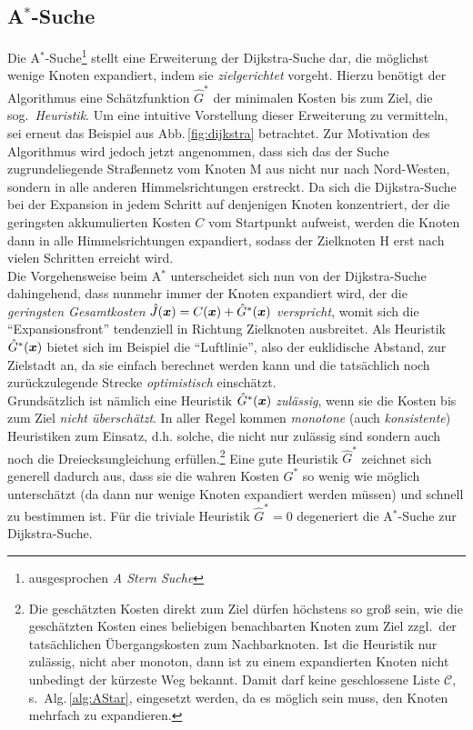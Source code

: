 \subsection{A$^\ast$-Suche} \label{sec:astern}
Die A$^\ast$-Suche\footnote{ausgesprochen \emph{A Stern Suche}} stellt eine Erweiterung der Dijkstra-Suche dar, die möglichst wenige Knoten expandiert, indem sie \emph{zielgerichtet} vorgeht. 
Hierzu benötigt der Algorithmus eine Schätzfunktion $\hat {G}^\ast$ der minimalen Kosten bis zum Ziel, die sog.\ \emph{Heuristik}. Um eine intuitive Vorstellung dieser Erweiterung zu vermitteln, sei erneut das Beispiel aus Abb.\,\ref{fig:dijkstra} betrachtet. Zur Motivation des Algorithmus wird jedoch jetzt angenommen, dass sich das der Suche zugrundeliegende Straßennetz vom Knoten M aus nicht nur nach Nord-Westen, sondern in alle anderen Himmelsrichtungen erstreckt. Da sich die Dijkstra-Suche bei der Expansion in jedem Schritt auf denjenigen Knoten konzentriert, der die geringsten akkumulierten Kosten $C$ vom Startpunkt aufweist, werden die Knoten dann in alle Himmelsrichtungen expandiert, sodass der Zielknoten H erst nach vielen Schritten erreicht wird. \\
Die Vorgehensweise beim A$^\ast$ unterscheidet sich nun von der Dijkstra-Suche dahingehend, dass nunmehr immer der Knoten expandiert wird, der die \emph{geringsten Gesamtkosten} $\hat J(\boldsymbol{x})  = C(\boldsymbol{x}) + \hat {G}^\ast(\boldsymbol{x})$ \emph{verspricht}, womit sich die "`Expansionsfront"' tendenziell in Richtung Zielknoten ausbreitet. Als Heuristik $\hat {G}^\ast(\boldsymbol{x})$ bietet sich im Beispiel die "`Luftlinie"', also der euklidische Abstand, zur Zielstadt an, da sie einfach berechnet werden kann und die tatsächlich noch zurückzulegende Strecke \emph{optimistisch}
einschätzt. \\ 
Grundsätzlich ist nämlich eine Heuristik $\hat {G}^\ast(\boldsymbol{x})$ \emph{zulässig}, wenn sie die Kosten bis zum Ziel \emph{nicht überschätzt}. In aller Regel kommen \emph{monotone} (auch \emph{konsistente})  Heuristiken zum Einsatz, d.h. solche, die nicht nur zulässig sind sondern auch noch die Dreiecksungleichung erfüllen.\footnote{Die geschätzten Kosten direkt zum Ziel dürfen höchstens so groß sein, wie die geschätzten Kosten eines beliebigen benachbarten Knoten zum Ziel zzgl.\ der tatsächlichen Übergangskosten zum Nachbarknoten. Ist die Heuristik nur zulässig, nicht aber monoton, dann ist zu einem expandierten Knoten nicht unbedingt der kürzeste Weg bekannt. Damit darf keine geschlossene Liste $\mathcal C$, s.\ Alg.\,\ref{alg:AStar}, eingesetzt werden, da es möglich sein muss, den Knoten mehrfach zu expandieren.} Eine gute Heuristik $\hat {G}^\ast$ zeichnet sich generell dadurch aus, dass sie die wahren Kosten $G^\ast$ so wenig wie möglich unterschätzt (da dann nur wenige Knoten expandiert werden müssen) und schnell zu bestimmen ist. Für die triviale Heuristik $\hat {G}^\ast = 0$ degeneriert die A$^\ast$-Suche zur Dijkstra-Suche.
